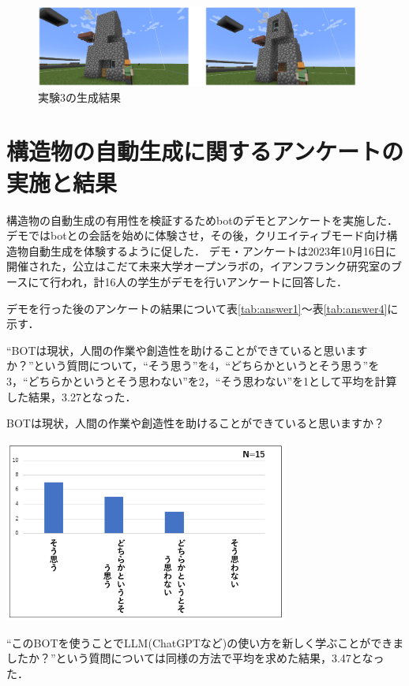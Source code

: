 \begin{figure}[H]
    \centering
    \includegraphics[width=0.95\textwidth]{fig/add_window2.PNG}
    \caption{実験3の生成結果}
    \label{fig:add_window2}
\end{figure}

\section{構造物の自動生成に関するアンケートの実施と結果}\label{sec:survey_result}
構造物の自動生成の有用性を検証するためbotのデモとアンケートを実施した．
デモではbotとの会話を始めに体験させ，その後，クリエイティブモード向け構造物自動生成を体験するように促した．
デモ・アンケートは2023年10月16日に開催された，公立はこだて未来大学オープンラボの，イアンフランク研究室のブースにて行われ，計16人の学生がデモを行いアンケートに回答した．

デモを行った後のアンケートの結果について表\ref{tab:answer1}～表\ref{tab:answer4}に示す．

``BOTは現状，人間の作業や創造性を助けることができていると思いますか？''という質問について，``そう思う''を4，``どちらかというとそう思う''を3，``どちらかというとそう思わない''を2，``そう思わない''を1として平均を計算した結果，3.27となった．
\begin{table}[H]
    \centering
    \caption{BOTは現状，人間の作業や創造性を助けることができていると思いますか？}
    \label{tab:answer1}
    \includegraphics[width=0.7\textwidth]{fig/tab1.PNG}
\end{table}

``このBOTを使うことでLLM(ChatGPTなど)の使い方を新しく学ぶことができましたか？''という質問については同様の方法で平均を求めた結果，3.47となった．

